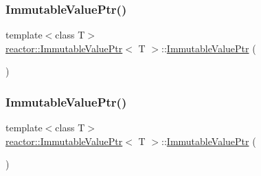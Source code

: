 \mbox{\label{classreactor_1_1ImmutableValuePtr_a607b854e71fd1ec5333ae97b15b8fc8d}} 
\subsubsection{\texorpdfstring{Immutable\+Value\+Ptr()}{ImmutableValuePtr()}\hspace{0.1cm}{\footnotesize\ttfamily [3/6]}}
{\footnotesize\ttfamily template$<$class T$>$ \\
\hyperlink{classreactor_1_1ImmutableValuePtr}{reactor\+::\+Immutable\+Value\+Ptr}$<$ T $>$\+::\hyperlink{classreactor_1_1ImmutableValuePtr}{Immutable\+Value\+Ptr} (\begin{DoxyParamCaption}\item[{const \hyperlink{classreactor_1_1ImmutableValuePtr}{Immutable\+Value\+Ptr}$<$ T $>$ \&}]{ }\end{DoxyParamCaption})\hspace{0.3cm}{\ttfamily [default]}}

\mbox{\label{classreactor_1_1ImmutableValuePtr_acd518265a1c01dd99d48254922264f23}} 
\subsubsection{\texorpdfstring{Immutable\+Value\+Ptr()}{ImmutableValuePtr()}\hspace{0.1cm}{\footnotesize\ttfamily [4/6]}}
{\footnotesize\ttfamily template$<$class T$>$ \\
\hyperlink{classreactor_1_1ImmutableValuePtr}{reactor\+::\+Immutable\+Value\+Ptr}$<$ T $>$\+::\hyperlink{classreactor_1_1ImmutableValuePtr}{Immutable\+Value\+Ptr} (\begin{DoxyParamCaption}\item[{\hyperlink{classreactor_1_1ImmutableValuePtr}{Immutable\+Value\+Ptr}$<$ T $>$ \&\&}]{ }\end{DoxyParamCaption})\hspace{0.3cm}{\ttfamily [default]}}

